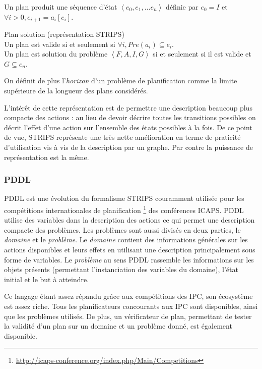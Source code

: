Un plan produit une séquence d'état $\left<e_0, e_1, ... e_n\right>$ définie par $e_0 = I$ et $\forall i > 0, e_{i+1} = a_i[e_i]$. 

\begin{definition}Plan solution (représentation STRIPS)\\
\label{def:solution_strips}Un plan est valide si et seulement si $\forall i, Pre(a_i) \subseteq e_i$.\\	
Un plan est solution du problème $\left<F,A,I,G\right>$ si et seulement si il est valide et $G \subseteq e_n$.
\end{definition}

On définit de plus l'\emph{horizon} d'un problème de planification comme la limite supérieure de la longueur des plans considérés.

L'intérêt de cette représentation est de permettre une description beaucoup plus compacte des actions : au lieu de devoir décrire toutes les transitions possibles on décrit l'effet d'une action sur l'ensemble des états possibles à la fois. De ce point de vue, STRIPS représente une très nette amélioration en terme de praticité d'utilisation vis à vis de la description par un graphe. Par contre la puissance de représentation est la même.

\subsubsection{PDDL}

PDDL \cite{pddl1998} est une évolution du formalisme STRIPS couramment utilisée pour les compétitions internationales de planification \footnote{\url{http://icaps-conference.org/index.php/Main/Competitions}} des conférences ICAPS.
PDDL utilise des variables dans la description des actions ce qui permet une description compacte des problèmes.
Les problèmes sont aussi divisés en deux parties, le \emph{domaine} et le \emph{problème}.
Le \emph{domaine} contient des informations générales sur les actions disponibles et leurs effets en utilisant une description principalement sous forme de variables.
Le \emph{problème} au sens PDDL rassemble les informations sur les objets présents (permettant l'instanciation des variables du domaine), l'état initial et le but à atteindre.

Ce langage étant assez répandu grâce aux compétitions des IPC, son écosystème est assez riche. 
Tous les planificateurs concourants aux IPC sont disponibles, ainsi que les problèmes utilisés.
De plus, un vérificateur de plan, permettant de tester la validité d'un plan sur un domaine et un problème donné, est également disponible.

